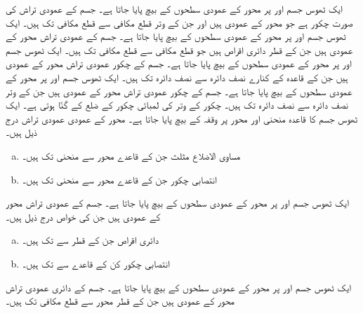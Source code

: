 ایک ٹھوس جسم  اور  پر   محور کے عمودی سطحوں کے بیچ پایا جاتا ہے۔ جسم کے عمودی تراش کی صورت چکور ہے جو   محور کے عمودی ہیں اور جن کے وتر قطع مکافی  سے قطع مکافی  تک ہیں۔   
ایک ٹھوس جسم  اور  پر   محور کے عمودی سطحوں کے بیچ پایا جاتا ہے۔ جسم کے عمودی تراش  محور کے عمودی ہیں جن کے قطر دائری اقراص ہیں جو قطع مکافی  سے قطع مکافی  تک ہیں۔   
ایک ٹھوس جسم  اور  پر   محور کے عمودی سطحوں کے بیچ پایا جاتا ہے۔ جسم کے چکور عمودی تراش  محور کے عمودی ہیں جن کے قاعدہ کے کنارے نصف دائرہ  سے نصف دائرہ  تک ہیں۔   
ایک ٹھوس جسم  اور  پر   محور کے عمودی سطحوں کے بیچ پایا جاتا ہے۔ جسم کے چکور عمودی تراش  محور کے عمودی ہیں جن کے وتر نصف دائرہ  سے نصف دائرہ  تک ہیں۔ چکور کے وتر کی لمبائی چکور کے ضلع کے  گنّا ہوتی ہے۔
ایک ٹھوس جسم کا قاعدہ منحنی  اور  محور پر وقفہ   کے بیچ پایا جاتا ہے۔  محور کے عمودی عمودی تراش درج ذیل ہیں۔
\begin{enumerate}[a.]
\item
مساوی الاضلاع  مثلث جن کے قاعدے  محور سے منحنی تک ہیں۔
\item
انتصابی چکور جن کے قاعدے  محور سے منحنی تک ہیں۔
\end{enumerate}
ایک ٹھوس جسم  اور  پر   محور کے عمودی سطحوں کے بیچ پایا جاتا ہے۔ جسم کے  عمودی تراش  محور کے عمودی ہیں جن کی خواص درج ذیل ہیں۔
\begin{enumerate}[a.]
\item
دائری اقراص جن کے قطر  سے  تک ہیں۔
\item
انتصابی چکور کن کے قاعدے   سے  تک ہیں۔
\end{enumerate}
ایک ٹھوس جسم  اور  پر   محور کے عمودی سطحوں کے بیچ پایا جاتا ہے۔ جسم کے دائری عمودی تراش  محور کے عمودی ہیں جن کے قطر  محور سے قطع مکافی  تک ہیں۔
